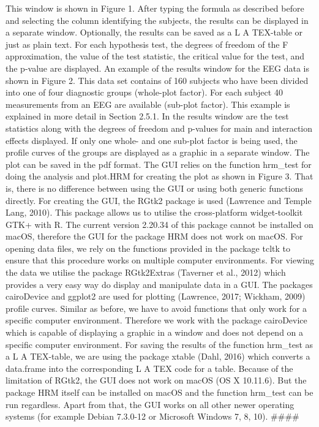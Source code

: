 This window is shown in Figure 1. After typing the formula
as described before and selecting the column identifying the subjects, the results can be displayed
in a separate window. Optionally, the results can be saved as a L A TEX-table or just as plain text. For
each hypothesis test, the degrees of freedom of the F approximation, the value of the test statistic, the
critical value for the test, and the p-value are displayed. An example of the results window for the
EEG data is shown in Figure 2. This data set contains of 160 subjects who have been divided into
one of four diagnostic groups (whole-plot factor). For each subject 40 measurements from an EEG
are available (sub-plot factor). This example is explained in more detail in Section 2.5.1. In the results
window are the test statistics along with the degrees of freedom and p-values for main and interaction
effects displayed.
If only one whole- and one sub-plot factor is being used, the profile curves of the groups are
displayed as a graphic in a separate window. The plot can be saved in the pdf format.
The GUI relies on the function hrm\_test for doing the analysis and plot.HRM for creating the plot
as shown in Figure 3. That is, there is no difference between using the GUI or using both generic
functions directly. For creating the GUI, the RGtk2 package is used (Lawrence and Temple Lang, 2010).
This package allows us to utilise the cross-platform widget-toolkit GTK+ with R. The current version
2.20.34 of this package cannot be installed on macOS, therefore the GUI for the package HRM does
not work on macOS.
For opening data files, we rely on the functions provided in the package tcltk to ensure that this
procedure works on multiple computer environments. For viewing the data we utilise the package
RGtk2Extras (Taverner et al., 2012) which provides a very easy way do display and manipulate data in
a GUI. The packages cairoDevice and ggplot2 are used for plotting (Lawrence, 2017; Wickham, 2009)
profile curves. Similar as before, we have to avoid functions that only work for a specific computer
environment. Therefore we work with the package cairoDevice which is capable of displaying a
graphic in a window and does not depend on a specific computer environment. For saving the results
of the function hrm\_test as a L A TEX-table, we are using the package xtable (Dahl, 2016) which converts
a data.frame into the corresponding L A TEX code for a table.
Because of the limitation of RGtk2, the GUI does not work on macOS (OS X 10.11.6). But the
package HRM itself can be installed on macOS and the function hrm\_test can be run regardless.
Apart from that, the GUI works on all other newer operating systems (for example Debian 7.3.0-12 or
Microsoft Windows 7, 8, 10).
####

